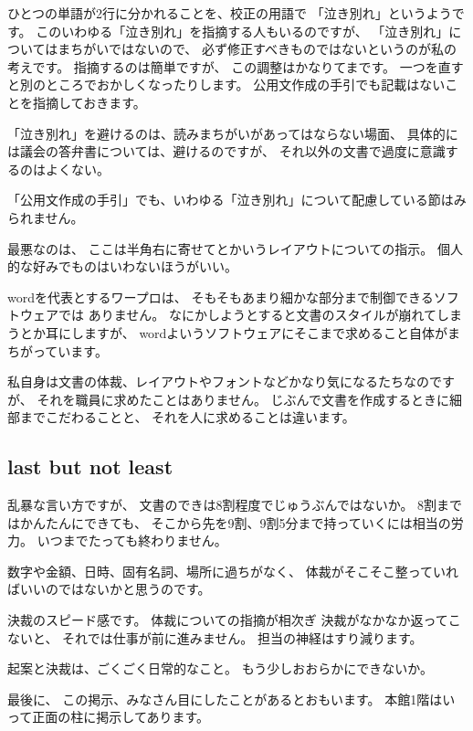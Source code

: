 \documentclass[uplatex,jis2004,dvipdfmx,12pt]{jsarticle}
\begin{document}

ひとつの単語が2行に分かれることを、校正の用語で
「泣き別れ」というようです。
このいわゆる「泣き別れ」を指摘する人もいるのですが、
「泣き別れ」についてはまちがいではないので、
必ず修正すべきものではないというのが私の考えです。
指摘するのは簡単ですが、
この調整はかなりてまです。
一つを直すと別のところでおかしくなったりします。
公用文作成の手引でも記載はないことを指摘しておきます。

「泣き別れ」を避けるのは、読みまちがいがあってはならない場面、
具体的には議会の答弁書については、避けるのですが、
それ以外の文書で過度に意識するのはよくない。

「公用文作成の手引」でも、いわゆる「泣き別れ」について配慮している節はみ
られません。

最悪なのは、
ここは半角右に寄せてとかいうレイアウトについての指示。
個人的な好みでものはいわないほうがいい。


wordを代表とするワープロは、
そもそもあまり細かな部分まで制御できるソフトウェアでは
ありません。
なにかしようとすると文書のスタイルが崩れてしまうとか耳にしますが、
wordよいうソフトウェアにそこまで求めること自体がまちがっています。



私自身は文書の体裁、レイアウトやフォントなどかなり気になるたちなのですが、
それを職員に求めたことはありません。
じぶんで文書を作成するときに細部までこだわることと、
それを人に求めることは違います。


\subsection{last but not least}
乱暴な言い方ですが、
文書のできは8割程度でじゅうぶんではないか。
8割まではかんたんにできても、
そこから先を9割、9割5分まで持っていくには相当の労力。
いつまでたっても終わりません。


数字や金額、日時、固有名詞、場所に過ちがなく、
体裁がそこそこ整っていればいいのではないかと思うのです。

決裁のスピード感です。
体裁についての指摘が相次ぎ
決裁がなかなか返ってこないと、
それでは仕事が前に進みません。
担当の神経はすり減ります。

起案と決裁は、ごくごく日常的なこと。
もう少しおおらかにできないか。



最後に、
この掲示、みなさん目にしたことがあるとおもいます。
本館1階はいって正面の柱に掲示してあります。
\end{document}
